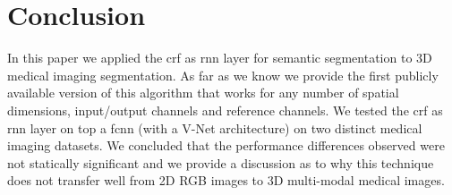 \documentclass{article}
\begin{document}
\section{Conclusion}

In this paper we applied the \gls{crf} as \gls{rnn} layer for semantic segmentation to 3D medical imaging segmentation. 
As far as we know we provide the first publicly available version of this algorithm that works for any number of spatial dimensions, input/output channels and reference channels.
We tested the \gls{crf} as \gls{rnn} layer on top a \gls{fcnn} (with a V-Net architecture) on two distinct medical imaging datasets.
We concluded that the performance differences observed were not statically significant and we provide a discussion as to why this technique does not transfer well from 2D RGB images to 3D multi-modal medical images.


 
\end{document}
